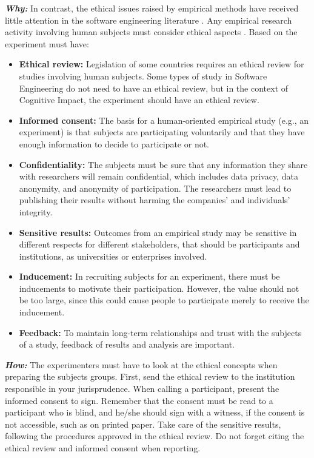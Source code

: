\noindent \textit{\textbf{Why:}} In contrast, the ethical issues raised by empirical methods have received little attention in the software engineering literature \cite{Vinson2008AHumans}. Any empirical research activity involving human subjects must consider ethical aspects \cite{Wohlin2000}.  Based on \cite{Vinson2008AHumans}  the experiment must have:
\begin{itemize}
    \item \textbf{Ethical review:} Legislation of some countries requires an ethical review for studies involving human subjects. Some types of study in Software Engineering do not need to have an ethical review, but in the context of Cognitive Impact, the experiment should have an ethical review.
    \item \textbf{Informed consent:} The basis for a human-oriented empirical study (e.g., an experiment) is that subjects are participating voluntarily and that they have enough information to decide to participate or not.
    \item \textbf{Confidentiality:} The subjects must be sure that any information they share with researchers will remain confidential, which includes data privacy, data anonymity, and anonymity of participation. The researchers must lead to publishing their results without harming the companies’ and individuals’ integrity.
    \item \textbf{Sensitive results:} Outcomes from an empirical study may be sensitive in different respects for different stakeholders, that should be participants and institutions, as universities or enterprises involved.
    \item \textbf{Inducement:} In recruiting subjects for an experiment, there must be inducements to motivate their participation. However, the value should not be too large, since this could cause people to participate merely to receive the inducement.
    \item \textbf{ Feedback:} To maintain long-term relationships and trust with the subjects of a study, feedback of results and analysis are important.
    
\end{itemize}
\vspace{5mm}

\noindent \textit{\textbf{How:}} The experimenters must have to look at the ethical concepts when preparing the subjects groups. First, send the ethical review to the institution responsible in your jurisprudence. When calling a participant, present the informed consent to sign. Remember that the consent must be read to a participant who is blind, and he/she should sign with a witness, if the consent is not accessible, such as on printed paper. Take care of the sensitive results, following the procedures approved in the ethical review. Do not forget citing the ethical review and informed consent when reporting.
\vspace{5mm}

